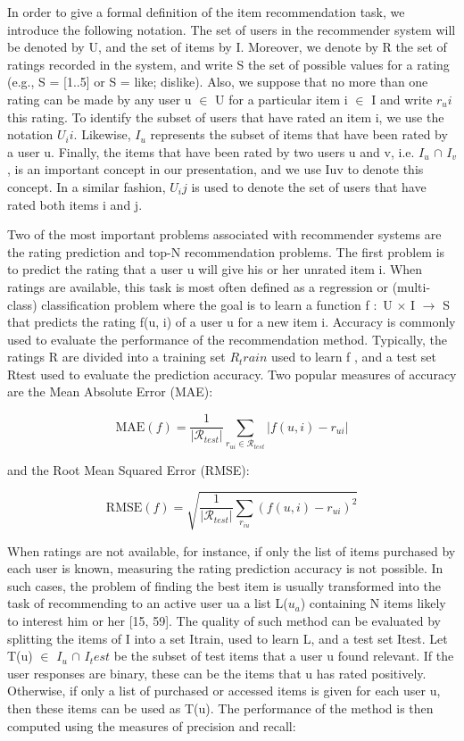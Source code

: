 In order to give a formal definition of the item recommendation task, we introduce the following notation. The set of users in the recommender system will be denoted by U, and the set of items by I. Moreover, we denote by R the set of ratings recorded in the system, and write S the set of possible values for a rating (e.g., S = [1..5] or S = {like; dislike}). Also, we suppose that no more than one rating can be made by any user u $\in$  U for a particular item i $\in$ I and write $r_ui$ this rating. To identify the subset of users that have rated an item i, we use the notation $U_ii$. Likewise, $I_u$ represents the subset of items that have been rated by a user u. Finally, the items that have been rated by two users u and v, i.e. $I_u$ $\cap$ $I_v$, is an important concept in our presentation, and we use Iuv to denote this concept. In a similar fashion, $U_ij$ is used to denote the set of users that have rated both items i and j.

Two of the most important problems associated with recommender systems are the rating prediction and top-N recommendation problems. The first problem is to predict the rating that a user u will give his or her unrated item i. When ratings are available, this task is most often defined as a regression or (multi-class) classification problem where the goal is to learn a function f $\colon$ U $\times$ I $\rightarrow$ S that predicts the rating f(u, i) of a user u for a new item i. Accuracy is commonly used to evaluate the performance of the recommendation method. Typically, the ratings R are divided into a training set $R_train$ used to learn f , and a test set Rtest used to evaluate the prediction accuracy. Two popular measures of accuracy are the Mean Absolute Error (MAE):

$$
\mathrm { MAE } ( f ) = \frac { 1 } { \left| \mathcal { R } _ {test} \right| } \sum _ { r _ { u i } \in \mathcal { R } _ {test} } \left| f ( u , i ) - r _ { u i } \right|
$$

and the Root Mean Squared Error (RMSE):

$$
\mathrm { RMSE } ( f ) = \sqrt { \frac { 1 } { \left| \mathcal { R } _ { test} \right| } \sum _ { r _ { i u } } \left( f ( u , i ) - r _ { u i } \right) ^ { 2 } }
$$

When ratings are not available, for instance, if only the list of items purchased by each user is known, measuring the rating prediction accuracy is not possible. In such cases, the problem of finding the best item is usually transformed into the task of recommending to an active user ua a list L($u_a$) containing N items likely to interest him or her [15, 59]. The quality of such method can be evaluated by splitting the items of I into a set Itrain, used to learn L, and a test set Itest. Let  T(u) $\in$ $I_u$ $\cap$ $I_test$ be the subset of test items that a user u found relevant. If the user responses are binary, these can be the items that u has rated positively. Otherwise, if only a list of purchased or accessed items is given for each user u, then these items can be used as T(u). The performance of the method is then computed using the measures of precision and recall:

